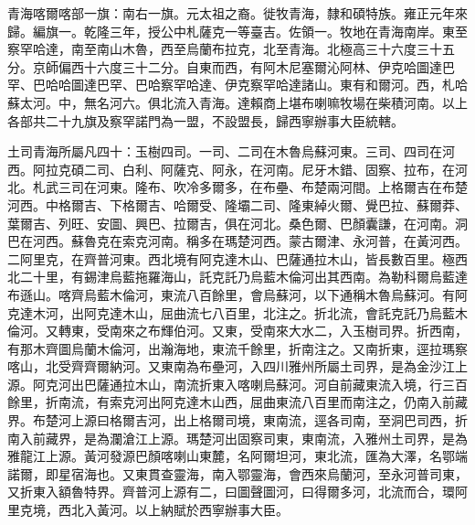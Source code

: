 \begin{pinyinscope}
青海喀爾喀部一旗：南右一旗。元太祖之裔。徙牧青海，隸和碩特族。雍正元年來歸。編旗一。乾隆三年，授公中札薩克一等臺吉。佐領一。牧地在青海南岸。東至察罕哈達，南至南山木魯，西至烏蘭布拉克，北至青海。北極高三十六度三十五分。京師偏西十六度三十二分。自東而西，有阿木尼塞爾沁阿林、伊克哈圖達巴罕、巴哈哈圖達巴罕、巴哈察罕哈達、伊克察罕哈達諸山。東有和爾河。西，札哈蘇太河。中，無名河六。俱北流入青海。達賴商上堪布喇嘛牧場在柴積河南。以上各部共二十九旗及察罕諾門為一盟，不設盟長，歸西寧辦事大臣統轄。

土司青海所屬凡四十：玉樹四司。一司、二司在木魯烏蘇河東。三司、四司在河西。阿拉克碩二司、白利、阿薩克、阿永，在河南。尼牙木錯、固察、拉布，在河北。札武三司在河東。隆布、吹冷多爾多，在布壘、布楚兩河間。上格爾吉在布楚河西。中格爾吉、下格爾吉、哈爾受、隆壩二司、隆東綽火爾、覺巴拉、蘇爾莽、葉爾吉、列旺、安圖、興巴、拉爾吉，俱在河北。桑色爾、巴顏囊謙，在河南。洞巴在河西。蘇魯克在索克河南。稱多在瑪楚河西。蒙古爾津、永河普，在黃河西。二阿里克，在齊普河東。西北境有阿克達木山、巴薩通拉木山，皆長數百里。極西北二十里，有錫津烏藍拖羅海山，託克託乃烏藍木倫河出其西南。為勒科爾烏藍達布遜山。喀齊烏藍木倫河，東流八百餘里，會烏蘇河，以下通稱木魯烏蘇河。有阿克達木河，出阿克達木山，屈曲流七八百里，北注之。折北流，會託克託乃烏藍木倫河。又轉東，受南來之布輝伯河。又東，受南來大水二，入玉樹司界。折西南，有那木齊圖烏蘭木倫河，出瀚海地，東流千餘里，折南注之。又南折東，逕拉瑪察喀山，北受齊齊爾納河。又東南為布壘河，入四川雅州所屬土司界，是為金沙江上源。阿克河出巴薩通拉木山，南流折東入喀喇烏蘇河。河自前藏東流入境，行三百餘里，折南流，有索克河出阿克達木山西，屈曲東流八百里而南注之，仍南入前藏界。布楚河上源曰格爾吉河，出上格爾司境，東南流，逕各司南，至洞巴司西，折南入前藏界，是為瀾滄江上源。瑪楚河出固察司東，東南流，入雅州土司界，是為雅龍江上源。黃河發源巴顏喀喇山東麓，名阿爾坦河，東北流，匯為大澤，名鄂端諾爾，即星宿海也。又東貫查靈海，南入鄂靈海，會西來烏蘭河，至永河普司東，又折東入額魯特界。齊普河上源有二，曰圖聲圖河，曰得爾多河，北流而合，環阿里克境，西北入黃河。以上納賦於西寧辦事大臣。


\end{pinyinscope}